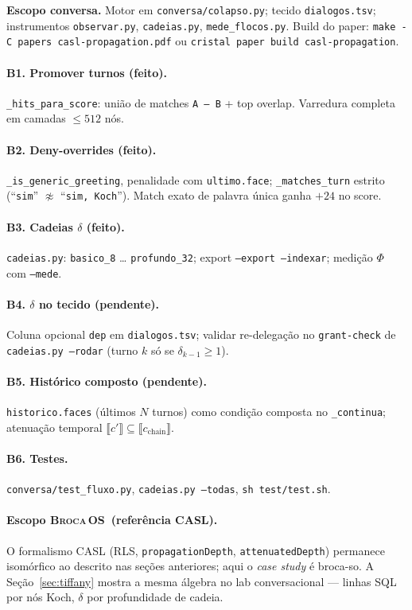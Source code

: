 \documentclass[11pt]{article}
\newcommand{\SO}{\textsc{Broca\,OS}}
\theoremstyle{definition}
\newcommand{\ext}[1]{\llbracket #1 \rrbracket}
\newcommand{\dep}{\delta}
\begin{document}
  \textbf{Escopo conversa.} Motor em \texttt{conversa/colapso.py}; tecido
  \texttt{dialogos.tsv}; instrumentos \texttt{observar.py}, \texttt{cadeias.py},
  \texttt{mede\_flocos.py}. Build do paper:
  \texttt{make -C papers casl-propagation.pdf} ou
  \texttt{cristal paper build casl-propagation}.

  \paragraph{B1. Promover turnos (feito).}
  \texttt{\_hits\_para\_score}: união de matches \texttt{A — B} + top overlap.
  Varredura completa em camadas $\le512$ nós.

  \paragraph{B2. Deny-overrides (feito).}
  \texttt{\_is\_generic\_greeting}, penalidade com \texttt{ultimo.face};
  \texttt{\_matches\_turn} estrito (``\texttt{sim}'' $\not\approx$ ``\texttt{sim, Koch}'').
  Match exato de palavra única ganha $+24$ no score.

  \paragraph{B3. Cadeias $\dep$ (feito).}
  \texttt{cadeias.py}: \texttt{basico\_8} … \texttt{profundo\_32}; export
  \texttt{--export --indexar}; medição $\Phi$ com \texttt{--mede}.

  \paragraph{B4. $\dep$ no tecido (pendente).}
  Coluna opcional \texttt{dep} em \texttt{dialogos.tsv}; validar re-delegação
  no \texttt{grant-check} de \texttt{cadeias.py --rodar} (turno $k$ só se
  $\dep_{k-1}\ge1$).

  \paragraph{B5. Histórico composto (pendente).}
  \texttt{historico.faces} (últimos $N$ turnos) como condição composta no
  \texttt{\_continua}; atenuação temporal $\ext{c'}\subseteq\ext{c_{\text{chain}}}$.

  \paragraph{B6. Testes.}
  \texttt{conversa/test\_fluxo.py}, \texttt{cadeias.py --todas}, \texttt{sh test/test.sh}.

  \paragraph{Escopo \SO\ (referência CASL).}
  O formalismo CASL (RLS, \texttt{propagationDepth}, \texttt{attenuatedDepth})
  permanece isomórfico ao descrito nas seções anteriores; aqui o \emph{case
  study} é broca-so. A Seção~\ref{sec:tiffany} mostra a mesma álgebra no lab
  conversacional --- linhas SQL por nós Koch, $\dep$ por profundidade de cadeia.

  
\end{document}
